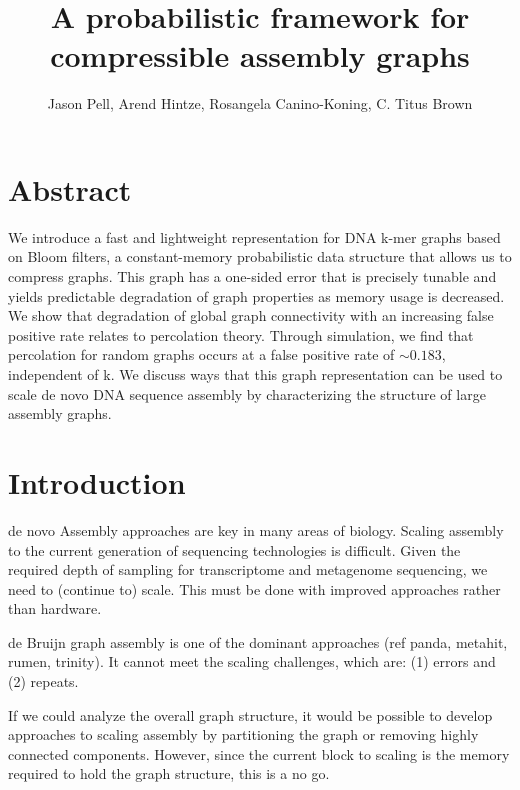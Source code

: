 \documentclass[12pt]{article} \usepackage{simplemargins}
\begin{document}
\title{A probabilistic framework for compressible assembly graphs}
\author{Jason Pell, Arend Hintze, Rosangela Canino-Koning, C. Titus Brown}

\maketitle

\section{Abstract}

We introduce a fast and lightweight representation for DNA k-mer graphs
based on Bloom filters, a constant-memory probabilistic data structure that allows us
to compress graphs.  This graph has a one-sided
error that is precisely tunable and yields predictable degradation of
graph properties as memory usage is decreased. We show that degradation of global graph connectivity with an increasing false
positive rate relates to percolation theory. Through 
simulation, we find that percolation for random graphs occurs at a false positive rate 
of $\sim0.183$, independent of k. We discuss ways that this
graph representation can be used to scale de novo DNA sequence assembly by characterizing the structure of
large assembly graphs.

\section{Introduction}

de novo Assembly approaches are key in many areas of biology.  Scaling
assembly to the current generation of sequencing technologies is
difficult.  Given the required depth of sampling for transcriptome and
metagenome sequencing, we need to (continue to) scale.  This must be
done with improved approaches rather than hardware.

de Bruijn graph assembly is one of the dominant approaches (ref panda,
metahit, rumen, trinity).  It cannot meet the scaling challenges, which
are: (1) errors and (2) repeats.  

If we could analyze the overall graph structure, it would be possible
to develop approaches to scaling assembly by partitioning the graph or
removing highly connected components.  However, since the current
block to scaling is the memory required to hold the graph structure,
this is a no go.
\end{document}
